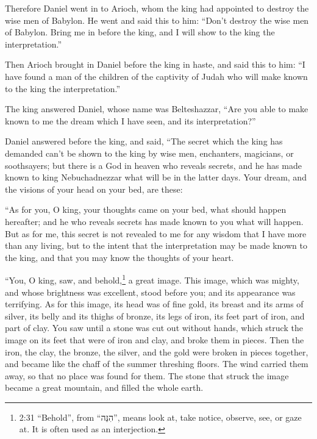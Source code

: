  Therefore Daniel went in to Arioch, whom the king had
appointed to destroy the wise men of Babylon. He went and said this to
him: ``Don't destroy the wise men of Babylon. Bring me in before the
king, and I will show to the king the interpretation.''

 Then Arioch brought in Daniel before the king in haste,
and said this to him: ``I have found a man of the children of the
captivity of Judah who will make known to the king the interpretation.''

 The king answered Daniel, whose name was Belteshazzar,
``Are you able to make known to me the dream which I have seen, and its
interpretation?''

 Daniel answered before the king, and said, ``The secret
which the king has demanded can't be shown to the king by wise men,
enchanters, magicians, or soothsayers;  but there is a God
in heaven who reveals secrets, and he has made known to king
Nebuchadnezzar what will be in the latter days. Your dream, and the
visions of your head on your bed, are these:

 ``As for you, O king, your thoughts came on your bed, what
should happen hereafter; and he who reveals secrets has made known to
you what will happen.  But as for me, this secret is not
revealed to me for any wisdom that I have more than any living, but to
the intent that the interpretation may be made known to the king, and
that you may know the thoughts of your heart.

 ``You, O king, saw, and behold,\footnote{2:31 ``Behold'',
  from ``הִנֵּה'', means look at, take notice, observe, see, or gaze at.
  It is often used as an interjection.} a great image. This image, which
was mighty, and whose brightness was excellent, stood before you; and
its appearance was terrifying.  As for this image, its head
was of fine gold, its breast and its arms of silver, its belly and its
thighs of bronze,  its legs of iron, its feet part of iron,
and part of clay.  You saw until a stone was cut out
without hands, which struck the image on its feet that were of iron and
clay, and broke them in pieces.  Then the iron, the clay,
the bronze, the silver, and the gold were broken in pieces together, and
became like the chaff of the summer threshing floors. The wind carried
them away, so that no place was found for them. The stone that struck
the image became a great mountain, and filled the whole earth.

